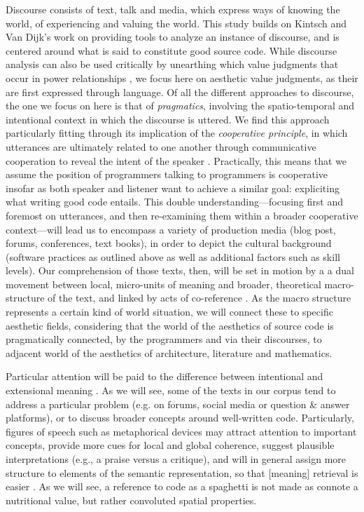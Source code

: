 Discourse consists of text, talk and media, which express ways of knowing the world, of experiencing and valuing the world. This study builds on Kintsch and Van Dijk's work on providing tools to analyze an instance of discourse, and is centered around what is said to constitute good source code. While discourse analysis can also be used critically by unearthing which value judgments that occur in power relationships \citep{mullet_general_2018a}, we focus here on aesthetic value judgments, as their are first expressed through language. Of all the different approaches to discourse, the one we focus on here is that of \emph{pragmatics}, involving the spatio-temporal and intentional context in which the discourse is uttered. We find this approach particularly fitting through its implication of the \emph{cooperative principle}, in which utterances are ultimately related to one another through communicative cooperation to reveal the intent of the speaker \citep{schiffrin_approaches_1994}. Practically, this means that we assume the position of programmers talking to programmers is cooperative insofar as both speaker and listener want to achieve a similar goal: expliciting what writing good code entails. This double understanding—focusing first and foremost on utterances, and then re-examining them within a broader cooperative context—will lead us to encompass a variety of production media (blog post, forums, conferences, text books), in order to depict the cultural background (software practices as outlined above as well as additional factors such as skill levels). Our comprehension of those texts, then, will be set in motion by a a dual movement between local, micro-units of meaning and broader, theoretical macro-structure of the text, and linked by acts of co-reference \citep{kintsch_model_1978}. As the macro structure represents a certain kind of world situation, we will connect these to specific aesthetic fields, considering that the world of the aesthetics of source code is pragmatically connected, by the programmers and via their discourses, to adjacent world of the aesthetics of architecture, literature and mathematics. 

Particular attention will be paid to the difference between intentional and extensional meaning \citep{dijk_strategies_1983}. As we will see, some of the texts in our corpus tend to address a particular problem (e.g. on forums, social media or question \& answer platforms), or to discuss broader concepts around well-written code. Particularly, figures of speech such as metaphorical devices may attract attention to important concepts, provide more cues for local and global coherence, suggest plausible interpretations (e.g., a praise versus a critique), and will in general assign more structure to elements of the semantic representation, so that [meaning] retrieval is easier \citep{dijk_strategies_1983}. As we will see, a reference to code as a spaghetti is not made as connote a nutritional value, but rather convoluted spatial properties.

